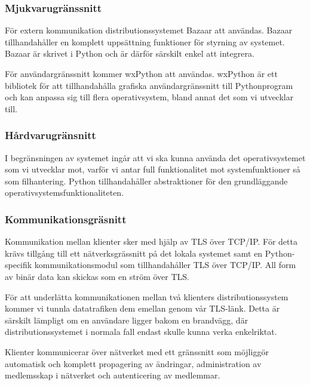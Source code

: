 \subsubsection{Mjukvarugränssnitt}
För extern kommunikation distributionssystemet Bazaar att användas. Bazaar tillhandahåller en komplett uppsättning funktioner för styrning av systemet. Bazaar är skrivet i Python och är därför särskilt enkel att integrera.

För användargränssnitt kommer wxPython att användas. wxPython är ett bibliotek för att tillhandahålla grafiska användargränssnitt till Pythonprogram och kan anpassa sig till flera operativsystem, bland annat det som vi utvecklar till.

\subsubsection{Hårdvarugränsnitt}
I begränsningen av systemet ingår att vi ska kunna använda det operativsystemet som vi utvecklar mot, varför vi antar full funktionalitet mot systemfunktioner så som filhantering. Python tillhandahåller abstraktioner för den grundläggande operativsystemsfunktionaliteten.

\subsubsection{Kommunikationsgräsnitt}
Kommunikation mellan klienter sker med hjälp av TLS över TCP/IP. För detta krävs tillgång till ett nätverksgrässnitt på det lokala systemet samt en Python-specifik kommunikationsmodul som tillhandahåller TLS över TCP/IP. All form av binär data kan skickas som en ström över TLS.

För att underlätta kommunikationen mellan två klienters distributionssystem kommer vi tunnla datatrafiken dem emellan genom vår TLS-länk. Detta är särskilt lämpligt om en användare ligger bakom en brandvägg, där distributionssystemet i normala fall endast skulle kunna verka enkelriktat.

Klienter kommunicerar över nätverket med ett gränssnitt som möjliggör automatisk och komplett propagering av ändringar, administration av medlemsskap i nätverket och autenticering av medlemmar.


